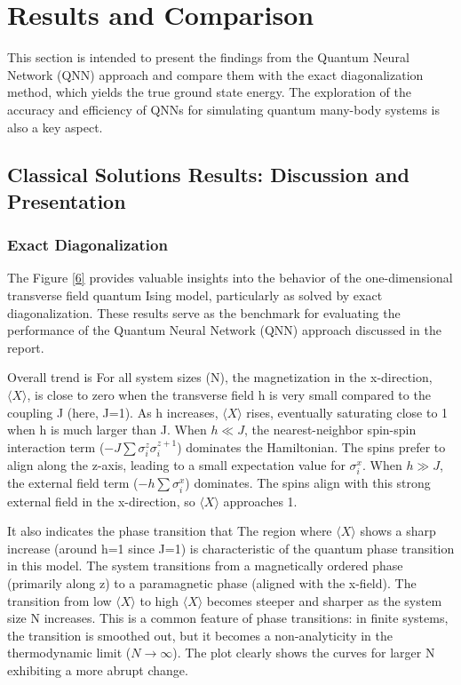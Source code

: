\documentclass[pre,twocolumn,floatfix]{revtex4-1}
\begin{document}
\section{Results and Comparison}
This section is intended to present the findings from the Quantum Neural Network (QNN) approach and compare them with the exact diagonalization method, which yields the true ground state energy. The exploration of the accuracy and efficiency of QNNs for simulating quantum many-body systems is also a key aspect.

\subsection{Classical Solutions Results: Discussion and Presentation}
\subsubsection{Exact Diagonalization}
The Figure \ref{6} provides valuable insights into the behavior of the one-dimensional transverse field quantum Ising model, particularly as solved by exact diagonalization. These results serve as the benchmark for evaluating the performance of the Quantum Neural Network (QNN) approach discussed in the report.

Overall trend is For all system sizes (N), the magnetization in the x-direction, $\langle X \rangle$, is close to zero when the transverse field h is very small compared to the coupling J (here, J=1). As h increases, $\langle X \rangle$ rises, eventually saturating close to 1 when h is much larger than J. When $h \ll J$, the nearest-neighbor spin-spin interaction term ($-J\sum\sigma_i^z\sigma_i^{z+1}$) dominates the Hamiltonian. The spins prefer to align along the z-axis, leading to a small expectation value for $\sigma_i^x$. When $h\gg J$, the external field term ($-h\sum\sigma_i^x$) dominates. The spins align with this strong external field in the x-direction, so $\langle X \rangle$ approaches 1.

It also indicates the phase transition that The region where $\langle X \rangle$ shows a sharp increase (around h=1 since J=1) is characteristic of the quantum phase transition in this model. The system transitions from a magnetically ordered phase (primarily along z) to a paramagnetic phase (aligned with the x-field). The transition from low $\langle X \rangle$ to high $\langle X \rangle$ becomes steeper and sharper as the system size N increases. This is a common feature of phase transitions: in finite systems, the transition is smoothed out, but it becomes a non-analyticity in the thermodynamic limit ($N \to \infty$). The plot clearly shows the curves for larger N exhibiting a more abrupt change.
\end{document}
